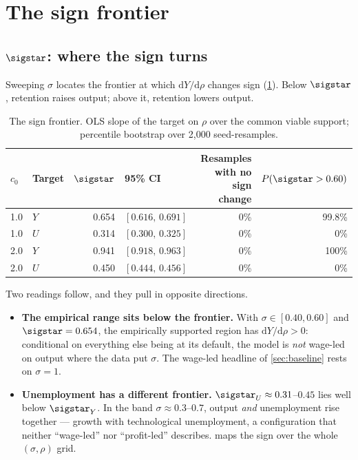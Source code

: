 
\section{The sign frontier}
\label{sec:frontier}

\subsection{\texorpdfstring{$\sigstar$}{sigma*}: where the sign turns}

Sweeping $\sigma$ locates the frontier at which $\mathrm{d}Y/\mathrm{d}\rho$
changes sign (\cref{tab:frontier}). Below $\sigstar$, retention raises output;
above it, retention lowers output.

\begin{table}[htbp]
\centering
\small
\caption{The sign frontier. OLS slope of the target on $\rho$ over the common
viable support; percentile bootstrap over 2{,}000 seed-resamples.}
\label{tab:frontier}
\begin{tabular}{llrlrr}
\toprule
$c_0$ & Target & $\sigstar$ & 95\% CI & Resamples with no sign change
& $P(\sigstar > 0.60)$\\
\midrule
1.0 & $Y$ & 0.654 & $[0.616,\,0.691]$ & 0\% & 99.8\%\\
1.0 & $U$ & 0.314 & $[0.300,\,0.325]$ & 0\% & 0\%\\
2.0 & $Y$ & 0.941 & $[0.918,\,0.963]$ & 0\% & 100\%\\
2.0 & $U$ & 0.450 & $[0.444,\,0.456]$ & 0\% & 0\%\\
\bottomrule
\end{tabular}
\end{table}

Two readings follow, and they pull in opposite directions.

\begin{itemize}
  \item \textbf{The empirical range sits below the frontier.} With $\sigma \in
  [0.40, 0.60]$ and $\sigstar = 0.654$, the empirically supported region has
  $\mathrm{d}Y/\mathrm{d}\rho > 0$: conditional on everything else being at
  its default, the model is \emph{not} wage-led on output where the data put
  $\sigma$. The wage-led headline of \cref{sec:baseline} rests on $\sigma = 1$.
  \item \textbf{Unemployment has a different frontier.} $\sigstar_U \approx
  0.31$--$0.45$ lies well below $\sigstar_Y$. In the band $\sigma \approx
  0.3$--$0.7$, output \emph{and} unemployment rise together --- growth with
  technological unemployment, a configuration that neither ``wage-led'' nor
  ``profit-led'' describes.  maps the sign over the whole
  $(\sigma,\rho)$ grid.
\end{itemize}

